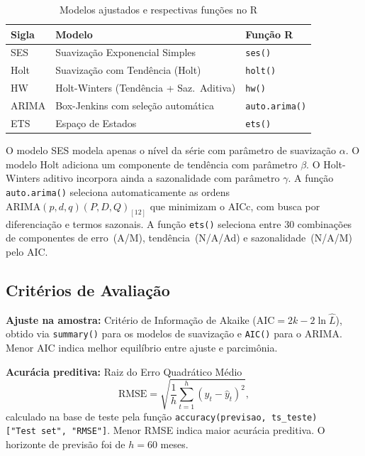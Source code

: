 \documentclass[12pt, a4paper]{article}
\begin{document}
\begin{table}[H]
  \centering
  \caption{Modelos ajustados e respectivas funções no R}
  \label{tab:modelos}
  \begin{tabular}{lll}
    \toprule
    \textbf{Sigla} & \textbf{Modelo} & \textbf{Função R} \\
    \midrule
    SES   & Suavização Exponencial Simples           & \texttt{ses()} \\
    Holt  & Suavização com Tendência (Holt)          & \texttt{holt()} \\
    HW    & Holt-Winters (Tendência + Saz.\ Aditiva) & \texttt{hw()} \\
    ARIMA & Box-Jenkins com seleção automática       & \texttt{auto.arima()} \\
    ETS   & Espaço de Estados                        & \texttt{ets()} \\
    \bottomrule
  \end{tabular}
\end{table}

O modelo SES modela apenas o nível da série com parâmetro de suavização
$\alpha$. O modelo Holt adiciona um componente de tendência com parâmetro
$\beta$. O Holt-Winters aditivo incorpora ainda a sazonalidade com parâmetro
$\gamma$. A função \texttt{auto.arima()} seleciona automaticamente as ordens
$\text{ARIMA}(p,d,q)(P,D,Q)_{[12]}$ que minimizam o AICc, com busca por
diferenciação e termos sazonais. A função \texttt{ets()} seleciona entre 30
combinações de componentes de erro~(A/M), tendência~(N/A/Ad) e
sazonalidade~(N/A/M) pelo AIC.

\subsection{Critérios de Avaliação}

\textbf{Ajuste na amostra:} Critério de Informação de Akaike
($\text{AIC} = 2k - 2\ln\hat{L}$), obtido via \texttt{summary()} para os
modelos de suavização e \texttt{AIC()} para o ARIMA. Menor AIC indica melhor
equilíbrio entre ajuste e parcimônia.

\textbf{Acurácia preditiva:} Raiz do Erro Quadrático Médio
\[
  \text{RMSE} = \sqrt{\frac{1}{h}\sum_{t=1}^{h}(y_t - \hat{y}_t)^2},
\]
calculado na base de teste pela função
\texttt{accuracy(previsao,~ts\_teste)["Test~set",~"RMSE"]}. Menor RMSE
indica maior acurácia preditiva. O horizonte de previsão foi de $h = 60$
meses.

\end{document}
